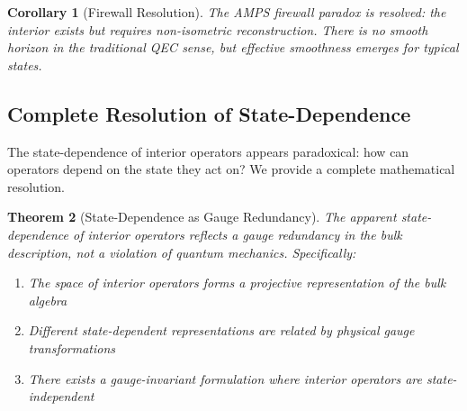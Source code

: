 \documentclass[12pt,a4paper]{article}
\newtheorem{theorem}{Theorem}[section]
\newtheorem{corollary}[theorem]{Corollary}
\begin{document}
\begin{corollary}[Firewall Resolution]
The AMPS firewall paradox is resolved: the interior exists but requires non-isometric reconstruction. There is no smooth horizon in the traditional QEC sense, but effective smoothness emerges for typical states.
\end{corollary}

\subsection{Complete Resolution of State-Dependence}

The state-dependence of interior operators appears paradoxical: how can operators depend on the state they act on? We provide a complete mathematical resolution.

\begin{theorem}[State-Dependence as Gauge Redundancy]\label{thm:state-dep-gauge}
The apparent state-dependence of interior operators reflects a gauge redundancy in the bulk description, not a violation of quantum mechanics. Specifically:
\begin{enumerate}
    \item The space of interior operators forms a \emph{projective} representation of the bulk algebra
    \item Different state-dependent representations are related by \emph{physical} gauge transformations
    \item There exists a \emph{gauge-invariant} formulation where interior operators are state-independent
\end{enumerate}
\end{theorem}
\end{document}
